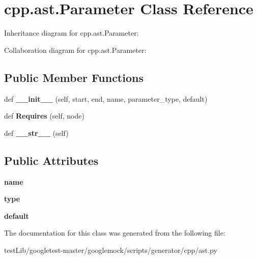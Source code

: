 \hypertarget{classcpp_1_1ast_1_1Parameter}{}\section{cpp.\+ast.\+Parameter Class Reference}
\label{classcpp_1_1ast_1_1Parameter}


Inheritance diagram for cpp.\+ast.\+Parameter\+:


Collaboration diagram for cpp.\+ast.\+Parameter\+:
\subsection*{Public Member Functions}
\begin{DoxyCompactItemize}
\item 
\mbox{\label{classcpp_1_1ast_1_1Parameter_a4fe27f559d44adac9e9b5898ba76c5b3}} 
def {\bfseries \+\_\+\+\_\+init\+\_\+\+\_\+} (self, start, end, name, parameter\+\_\+type, default)
\item 
\mbox{\label{classcpp_1_1ast_1_1Parameter_a4bc5c17a0d606d35be40cb4c2c1a67a6}} 
def {\bfseries Requires} (self, node)
\item 
\mbox{\label{classcpp_1_1ast_1_1Parameter_aabfbabb3c744a0da4a012ceb4299947a}} 
def {\bfseries \+\_\+\+\_\+str\+\_\+\+\_\+} (self)
\end{DoxyCompactItemize}
\subsection*{Public Attributes}
\begin{DoxyCompactItemize}
\item 
\mbox{\label{classcpp_1_1ast_1_1Parameter_aae0375fb0ded8fa9090feea6bdff2784}} 
{\bfseries name}
\item 
\mbox{\label{classcpp_1_1ast_1_1Parameter_a5eed090000c41551a10c21f175ad33e3}} 
{\bfseries type}
\item 
\mbox{\label{classcpp_1_1ast_1_1Parameter_a4ceae2ac87d82c5542c4e7385eb4c97e}} 
{\bfseries default}
\end{DoxyCompactItemize}


The documentation for this class was generated from the following file\+:\begin{DoxyCompactItemize}
\item 
test\+Lib/googletest-\/master/googlemock/scripts/generator/cpp/ast.\+py\end{DoxyCompactItemize}
